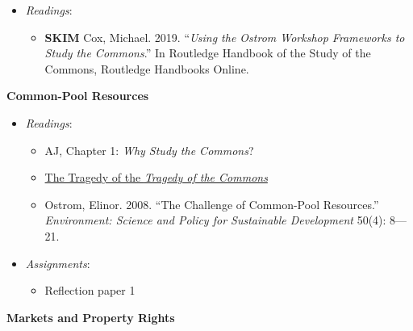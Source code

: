 \begin{itemize}

\item
  \emph{Readings}:

  \begin{itemize}
  
  \item
    \textbf{SKIM} Cox, Michael. 2019. ``\emph{Using the Ostrom Workshop
    Frameworks to Study the Commons}.'' In Routledge Handbook of the
    Study of the Commons, Routledge Handbooks Online.
  \end{itemize}
\end{itemize}

\week \textbf{Common-Pool Resources}

\begin{itemize}

\item
  \emph{Readings}:

  \begin{itemize}
  
  \item
    AJ, Chapter 1: \emph{Why Study the Commons}?
  \item
    \href{https://blogs.scientificamerican.com/voices/the-tragedy-of-the-tragedy-of-the-commons/}{The
    Tragedy of the \emph{Tragedy of the Commons}}
  \item
    Ostrom, Elinor. 2008. ``The Challenge of Common-Pool Resources.''
    \emph{Environment: Science and Policy for Sustainable Development}
    50(4): 8---21.
  \end{itemize}
\item
  \emph{Assignments}:

  \begin{itemize}
  
  \item
    Reflection paper 1
  \end{itemize}
\end{itemize}

\week \textbf{Markets and Property Rights}

